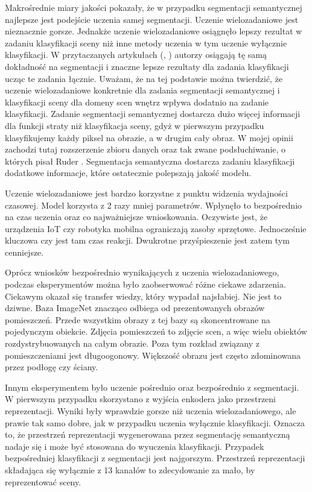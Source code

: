 Makrośrednie miary jakości pokazały, że w przypadku segmentacji semantycznej najlepsze jest podejście uczenia samej segmentacji. Uczenie wielozadaniowe jest nieznacznie gorsze. Jednakże uczenie wielozadaniowe osiągnęło lepszy rezultat w zadaniu klasyfikacji sceny niż inne metody uczenia w tym uczenie wyłącznie klasyfikacji. W przytaczanych artykułach (\cite{mehta2018net}, \cite{9892852}) autorzy osiągają tę samą dokładność na segmentacji i znaczne lepsze rezultaty dla zadania klasyfikacji ucząc te zadania łącznie. Uważam, że na tej podstawie można twierdzić, że uczenie wielozadaniowe konkretnie dla zadania segmentacji semantycznej i klasyfikacji sceny dla domeny scen wnętrz wpływa dodatnio na zadanie klasyfikacji. Zadanie segmentacji semantycznej dostarcza dużo więcej informacji dla funkcji straty niż klasyfikacja sceny, gdyż w pierwszym przypadku klasyfikujemy każdy piksel na obrazie, a w drugim cały obraz. W mojej opinii zachodzi tutaj rozszerzenie zbioru danych oraz tak zwane podsłuchiwanie, o których pisał Ruder \cite{ruder2017overview}. Segmentacja semantyczna dostarcza zadaniu klasyfikacji dodatkowe informacje, które ostatecznie polepszają jakość modelu.

Uczenie wielozadaniowe jest bardzo korzystne z punktu widzenia wydajności czasowej. Model korzysta z 2 razy mniej parametrów. Wpłynęło to bezpośrednio na czas uczenia oraz co najważniejsze wnioskowania. Oczywiste jest, że urządzenia IoT czy robotyka mobilna ograniczają zasoby sprzętowe. Jednocześnie kluczowa czy jest tam czas reakcji. Dwukrotne przyśpieszenie jest zatem tym cenniejsze.

Oprócz wniosków bezpośrednio wynikających z uczenia wielozadaniowego, podczas eksperymentów można było zaobserwować różne ciekawe zdarzenia. Ciekawym okazał się transfer wiedzy, który wypadał najsłabiej. Nie jest to dziwne. Baza ImageNet znacząco odbiega od prezentowanych obrazów pomieszczeń. Przede wszystkim obrazy z tej bazy są skoncentrowane na pojedynczym obiekcie. Zdjęcia pomieszczeń to zdjęcie scen, a więc wielu obiektów rozdystrybuowanych na całym obrazie. Poza tym rozkład związany z pomieszczeniami jest długoogonowy. Większość obrazu jest często zdominowana przez podłogę czy ściany.

Innym eksperymentem było uczenie pośrednio oraz bezpośrednio z segmentacji. W pierwszym przypadku skorzystano z wyjścia enkodera jako przestrzeni reprezentacji. Wyniki były wprawdzie gorsze niż uczenia wielozadaniowego, ale prawie tak samo dobre, jak w przypadku uczenia wyłącznie klasyfikacji. Oznacza to, że przestrzeń reprezentacji wygenerowana przez segmentację semantyczną nadaje się i może być stosowana do wyuczenia klasyfikacji. Przypadek bezpośredniej
klasyfikacji z segmentacji jest najgorszym. Przestrzeń reprezentacji składająca się wyłącznie z 13 kanałów to zdecydowanie za mało, by reprezentować sceny.

